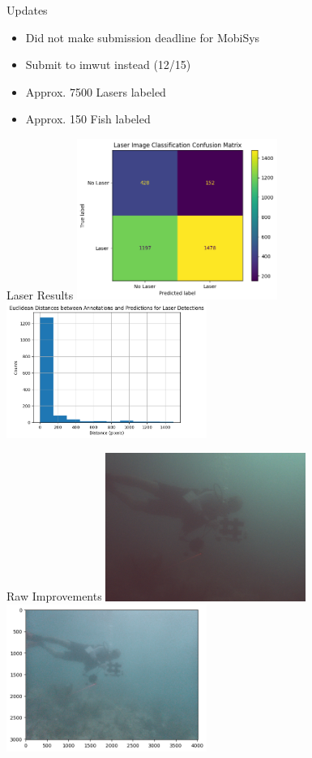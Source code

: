 \begin{frame}{Updates}
  \begin{itemize}
    \item Did not make submission deadline for MobiSys
    \item Submit to imwut instead (12/15)
    \item Approx. 7500 Lasers labeled
    \item Approx. 150 Fish labeled
  \end{itemize}
\end{frame}

\begin{frame}{Laser Results}
  \centering
  \includegraphics[height=0.7\textheight,width=0.49\textwidth,keepaspectratio]{images/a3d-laser-confusion.png}
  \includegraphics[height=0.7\textheight,width=0.49\textwidth,keepaspectratio]{images/a3d-laser-error.png}
\end{frame}

\begin{frame}{Raw Improvements}
  \centering
  \includegraphics[height=0.7\textheight,width=0.49\textwidth,keepaspectratio]{images/a3d-diver-old-raw.png}
  \includegraphics[height=0.7\textheight,width=0.49\textwidth,keepaspectratio]{images/a3d-diver-no-seathru.png}
\end{frame}

